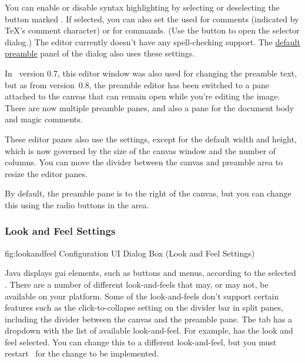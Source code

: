 You can enable or disable syntax highlighting by selecting or deselecting
the button marked . If
selected, you can also set the  used for comments
(indicated by \TeX's  comment character) or for commands.
(Use the  button to open the
 selector dialog.) The
editor currently doesn't have any spell-checking support.
The \hyperref[sec:texconfigpreamble]{default preamble} panel
of the  dialog also
uses these settings.

In \FlowframTk\ version 0.7, this editor window was also used for changing the
preamble text, but as from version~0.8, the preamble editor has been
switched to a pane attached to the \gls{canvas} that can remain open
while you're editing the image. There are now multiple preamble
panes, and also a pane for the document body and magic comments.

These editor panes also use the  settings,
except for the default width and height, which is now governed
by the size of the \gls{canvas} window and the number of columns. 
You can move the divider between the \gls{canvas} and preamble area 
to resize the editor panes.

By default, the preamble pane is to the right of the
\gls{canvas}, but you can change this using the radio buttons in the
 area.


\subsubsection{Look and Feel Settings}\label{sec:lookandfeel}


\FloatFig
  {fig:lookandfeel}
  {}
  {Configuration UI Dialog Box (Look and Feel Settings)}

Java displays \gls{gui} elements, such as buttons and menus,
according to the selected . There are a number of
different \glspl{look-and-feel} that may, or may not, be available on your
platform. Some of the \glspl{look-and-feel} don't support certain features
such as the click-to-collapse setting on the divider bar in split
panes, including the divider between the \gls{canvas} and the preamble
pane. The  tab has a
\gls{dropdown} with the list of available \gls{look-and-feel}. For
example,  has the  look and
feel selected. You can change this to a different \gls{look-and-feel}, but
you must restart \FlowframTk\ for the change to be implemented.

